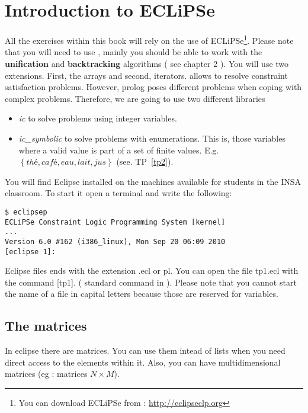 \chapter*{Introduction to ECLiPSe \prolog}
All the exercises within this book will rely on the use of ECLiPSe\footnote{You can download ECLiPSe from : \url{http://eclipseclp.org}}. 
Please note that you will need to use \prolog, mainly you should be able to work with the \textbf{unification} and \textbf{backtracking} algorithms ( see chapter 2 ). You will use two extensions. First, the arrays and second, iterators. \prolog{} allows to resolve constraint satisfaction problems. However, prolog poses different problems when coping with complex problems. Therefore, we are going to use two different libraries 

\begin{itemize}
\item \emph{ic} to solve problems using integer variables. 
\item \emph{ic\_symbolic} to solve problems with enumerations. This is, those variables where a valid value is part of a set of finite values. E.g. $\left\lbrace thé,
    café, eau, lait, jus\right\rbrace$ (see. TP~\ref{tp2}).\\
\end{itemize} 

You will find Eclipse installed on the machines available for students in the INSA classroom. To start it open a terminal and write the following:
 
\begin{verbatim}
$ eclipsep
ECLiPSe Constraint Logic Programming System [kernel]
...
Version 6.0 #162 (i386_linux), Mon Sep 20 06:09 2010
[eclipse 1]:
\end{verbatim}

Eclipse files ends with the extension .ecl or pl. You can open the file tp1.ecl with the command [tp1]. ( standard command in \prolog). Please note that you cannot start the name of a file in capital letters because those are reserved for variables. 

\section{The matrices}
In eclipse there are matrices. You can use them intead of lists when you need direct access to the elements within it. Also, you can have multidimensional matrices (eg : matrices $N \times
M$).


